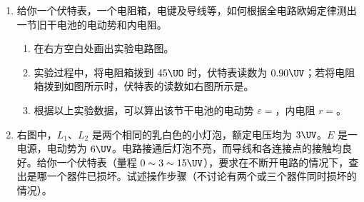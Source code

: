 \documentclass[\gkver]{gaokaozhenti}
\begin{document}
\begin{enumerate}


\item
给你一个伏特表，一个电阻箱，电键及导线等，如何根据全电路欧姆定律测出一节旧干电池的电动势和内电阻。
\begin{enumerate}
	\item
	在右方空白处画出实验电路图。

	\item
	实验过程中，将电阻箱拨到 $45\UO$ 时，伏特表读数为 $0.90\UV$；若将电阻箱拨到如图所示\tkanswer{$110\UO$}时，伏特表的读数如右图所示是\tkanswer{$1.10\UV$}。

	\item
	根据以上实验数据，可以算出该节干电池的电动势 $\varepsilon=$\tkanswer{$1.3\UV$}，内电阻 $r=$\tkanswer{$20\UO$}。
\end{enumerate}



\item
右图中，$L_{1}$、$L_{2}$ 是两个相同的乳白色的小灯泡，额定电压均为 $3\UV$。$E$ 是一电源，电动势为 $6\UV$。电路接通后灯泡不亮，而导线和各连接点的接触均良好。给你一个伏特表（量程 $0\sim3\sim15\UV$），要求在不断开电路的情况下，查出是哪一个器件已损坏。试述操作步骤（不讨论有两个或三个器件同时损坏的情况）。
\onepicture[align=right, w=4cm]{}


\end{enumerate}
\end{document}
